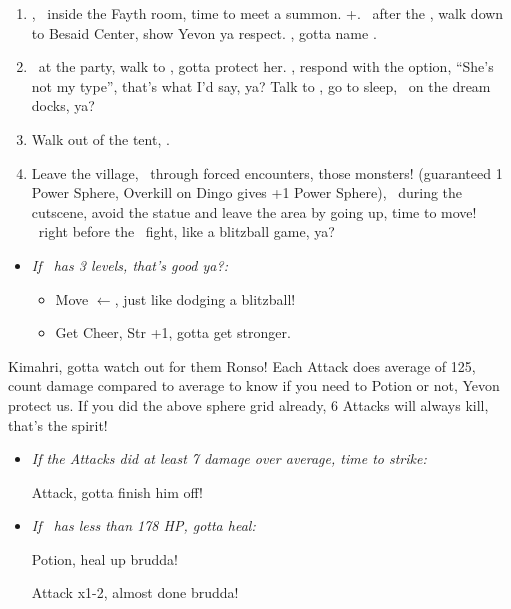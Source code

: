 \begin{enumerate}[resume]
    \item \cs[1:00], \sd\ inside the Fayth room, time to meet a summon. \fmv+\cs[1:00]. \sd\ after the \fmv, walk down to Besaid Center, show Yevon ya respect. \cs[1:40], gotta name \valefor.
    \item \sd\ at the party, walk to \yuna, gotta protect her. \sd, respond with the  option, ``She's not my type'', that's what I'd say, ya? Talk to \wakka, go to sleep, \sd\ on the dream docks, ya?
    \item Walk out of the tent, \sd.
    \item Leave the village, \sd\ through forced encounters, those monsters! (guaranteed 1 Power Sphere, Overkill on Dingo gives +1 Power Sphere), \sd\ during the cutscene, avoid the statue and leave the area by going up, time to move! \skippablefmv\ right before the \kimahri\ fight, like a blitzball game, ya?
\end{enumerate}
\begin{spheregrid}
    \begin{itemize}
        \item \textit{If \tidus\ has 3 levels, that's good ya?:}
        \begin{itemize}
            \item Move $\leftarrow$, just like dodging a blitzball!
            \item Get Cheer, Str +1, gotta get stronger.
        \end{itemize}
    \end{itemize}
\end{spheregrid}
\begin{battle}[750]{Kimahri, gotta watch out for them Ronso!}
    Each Attack does average of 125, count damage compared to average to know if you need to Potion or not, Yevon protect us.
    If you did the above sphere grid already, 6 Attacks will always kill, that's the spirit!
    \begin{itemize}
        \tidusf Attack x5, gotta show him what we got, ya?
        \item \textit{If the Attacks did at least 7 damage over average, time to strike:}
        \begin{itemize}
            \tidusf Attack, gotta finish him off!
        \end{itemize}
        \item \textit{If \tidus\ has less than 178 HP, gotta heal:}
        \begin{itemize}
            \tidusf Potion, heal up brudda!
        \end{itemize}
        \tidusf Attack x1-2, almost done brudda!
    \end{itemize}
\end{battle}
